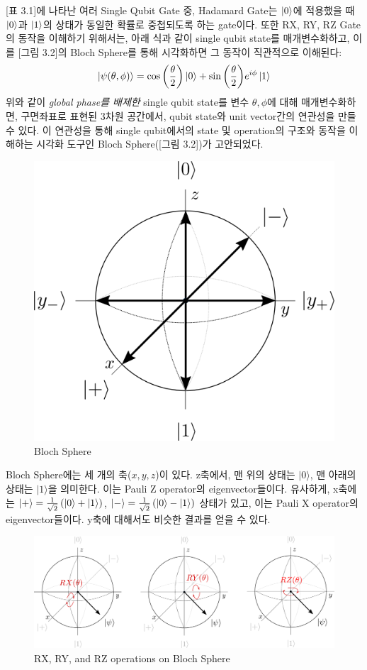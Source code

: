 [표 3.1]에 나타난 여러 Single Qubit Gate 중, Hadamard Gate는 \(\ket{0}\)에 적용했을 때 \(\ket 0\)과 \(\ket 1\)의 상태가 동일한 확률로 중첩되도록 하는 gate이다. 또한 RX, RY, RZ Gate의 동작을 이해하기 위해서는, 아래 식과 같이 single qubit state를 매개변수화하고, 이를 [그림 3.2]의 Bloch Sphere를 통해 시각화하면 그 동작이 직관적으로 이해된다:
\[
    \ket{\psi(\theta, \phi)} = \cos{\left({\theta \over 2}\right)}\ket 0 + \sin{\left({\theta \over 2}\right)}e^{i\phi} \ket 1
\]
위와 같이 \textit{global phase를 배제한 }single qubit state를 변수 \(\theta, \phi\)에 대해 매개변수화하면, 구면좌표로 표현된 3차원 공간에서, qubit state와 unit vector간의 연관성을 만들 수 있다. 이 연관성을 통해 single qubit에서의 state 및 operation의 구조와 동작을 이해하는 시각화 도구인 Bloch Sphere([그림 3.2])가 고안되었다.
\begin{figure}[htb!]
    \centering
    \includegraphics[width=0.6\linewidth]{figs/bloch_sphere.png}
    \caption{Bloch Sphere}
    \label{fig:bloch-sphere}
\end{figure}

\noindent Bloch Sphere에는 세 개의 축($x, y, z$)이 있다. z축에서, 맨 위의 상태는 $|0\rangle$, 맨 아래의 상태는 $|1\rangle$을 의미한다. 이는 Pauli Z operator의 eigenvector들이다. 유사하게, x축에는 $|+\rangle = {1\over \sqrt 2}\left(|0\rangle + |1\rangle\right)$, $|-\rangle = {1\over \sqrt 2}\left(|0\rangle - |1\rangle\right)$ 상태가 있고, 이는 Pauli X operator의 eigenvector들이다. y축에 대해서도 비슷한 결과를 얻을 수 있다.
\begin{figure}[htb!]
    \centering
    \includegraphics[width=1.0\linewidth]{figs/RXRYRZ.png}
    \caption{RX, RY, and RZ operations on Bloch Sphere}
    \label{fig:RX RY RZ}
\end{figure}

